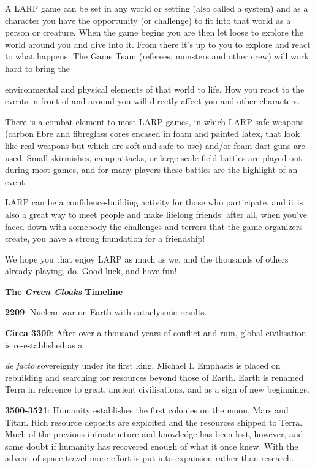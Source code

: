 A LARP game can be set in any world or setting (also called a system) and as a character you have the opportunity (or challenge) to fit into that world as a person or creature. When the game begins you are then let loose to explore the world around you and dive into it. From there it's up to you to explore and react to what happens. The Game Team (referees, monsters and other crew) will work hard to bring the

environmental and physical elements of that world to life. How you react to the events in front of and around you will directly affect you and other characters.

There is a combat element to most LARP games, in which LARP-safe weapons (carbon fibre and fibreglass cores encased in foam and painted latex, that look like real weapons but which are soft and safe to use) and/or foam dart guns are used. Small skirmishes, camp attacks, or large-scale field battles are played out during most games, and for many players these battles are the highlight of an event.

LARP can be a confidence-building activity for those who participate, and it is also a great way to meet people and make lifelong friends: after all, when you've faced down with somebody the challenges and terrors that the game organizers create, you have a strong foundation for a friendship!

We hope you that enjoy LARP as much as we, and the thousands of others already playing, do. Good luck, and have fun!

\textbf{The} \textbf{\textit{Green Cloaks}} \textbf{Timeline}

\textbf{2209}: Nuclear war on Earth with cataclysmic results.

\textbf{Circa 3300}: After over a thousand years of conflict and ruin, global civilisation is re-established as a

\textit{de facto} sovereignty under its first king, Michael I. Emphasis is placed on rebuilding and searching for resources beyond those of Earth. Earth is renamed Terra in reference to great, ancient civilisations, and as a sign of new beginnings.

\textbf{3500-3521}: Humanity establishes the first colonies on the moon, Mars and Titan. Rich resource deposits are exploited and the resources shipped to Terra. Much of the previous infrastructure and knowledge has been lost, however, and some doubt if humanity has recovered enough of what it once knew. With the advent of space travel more effort is put into expansion rather than research.

